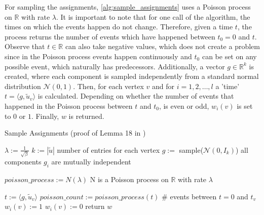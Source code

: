 For sampling the assignments, \cref{alg:sample_assignments} uses a Poisson process on $\mathbb{R}$ with rate $\lambda$. It is important to note that for one call of the algorithm, the times on which the events happen do not change. Therefore, given a time $t$, the process returns the number of events which have happened between $t_0 = 0$ and $t$. Observe that $t\in \mathbb{R}$ can also take negative values, which does not create a problem since in the Poisson process events happen continuously and $t_0$ can be set on any possible event, which naturally has predecessors.
Additionally, a vector $g \in \mathbb{R}^k$ is created, where each component is sampled independently from a standard normal distribution $\mathcal{N}(0,1)$. Then, for each vertex $v$ and for $i = 1, 2, \ldots, l$ a 'time' $t = \langle g, \tilde{u}_v \rangle $ is calculated.
Depending on whether the number of events that happened in the Poisson process between $t$ and $t_0$, is even or odd, $w_i(v)$ is set to $0$ or $1$. Finally, $w$ is returned.

\begin{algorithm}[htpb]
	\caption{Sample Assignments (proof of Lemma 18 in \cite{LouisM14}) \label{alg:sample_assignments}} 
	\begin{algorithmic}
		\State $\lambda := \frac{1}{\sqrt{\beta}}$
		\State $k:= |\tilde{u}|$ \Comment number of entries for each vertex
		\State $g:=$ sample($\mathcal{N}(0,I_k)$) \Comment all components $g_i$ are mutually independent 
		
		\State $poisson\_process := N(\lambda)$ \Comment N is a Poisson process on $\mathbb{R}$ with rate $\lambda$
		
		
		
		\State $t := \langle g, \tilde{u}_v \rangle $
		\State $poisson\_count := poisson\_process(t)$ \Comment \# events between $t=0$ and $t_v$
		\State $w_i(v) := 1$
		\Else
		\State  $w_i(v) := 0$
		\EndIf
		\EndFor
		\EndFor
		\State return $w$
		\EndFunction %
	\end{algorithmic}
\end{algorithm}	


